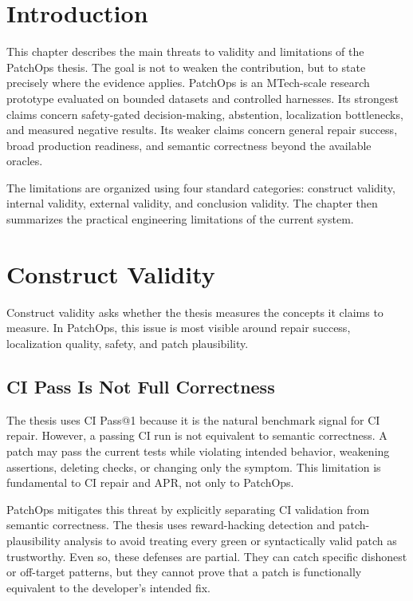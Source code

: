 \section{Introduction}

This chapter describes the main threats to validity and limitations of the PatchOps thesis. The goal is not to
weaken the contribution, but to state precisely where the evidence applies. PatchOps is an MTech-scale research
prototype evaluated on bounded datasets and controlled harnesses. Its strongest claims concern safety-gated
decision-making, abstention, localization bottlenecks, and measured negative results. Its weaker claims concern
general repair success, broad production readiness, and semantic correctness beyond the available oracles.

The limitations are organized using four standard categories: construct validity, internal validity, external
validity, and conclusion validity. The chapter then summarizes the practical engineering limitations of the
current system.

\section{Construct Validity}

Construct validity asks whether the thesis measures the concepts it claims to measure. In PatchOps, this issue
is most visible around repair success, localization quality, safety, and patch plausibility.

\subsection{CI Pass Is Not Full Correctness}

The thesis uses CI Pass@1 because it is the natural benchmark signal for CI repair. However, a passing CI run is
not equivalent to semantic correctness. A patch may pass the current tests while violating intended behavior,
weakening assertions, deleting checks, or changing only the symptom. This limitation is fundamental to CI repair
and APR, not only to PatchOps.

PatchOps mitigates this threat by explicitly separating CI validation from semantic correctness. The thesis
uses reward-hacking detection and patch-plausibility analysis to avoid treating every green or syntactically
valid patch as trustworthy. Even so, these defenses are partial. They can catch specific dishonest or off-target
patterns, but they cannot prove that a patch is functionally equivalent to the developer's intended fix.

